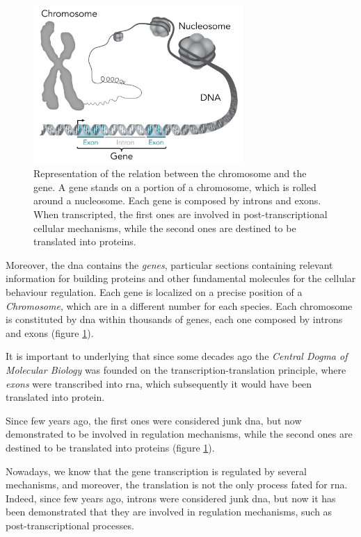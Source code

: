 \begin{figure}[h]
\centering
\includegraphics[width=8cm, keepaspectratio]{img/intro/gene_chrom.png}
\caption[Gene Chromosome relation]{Representation of the relation between the chromosome and the gene. 
A gene stands on a portion of a chromosome, which is rolled around a nucleosome.
Each gene is composed by introns and exons. When transcripted, the first ones are involved in post-transcriptional cellular mechanisms, while the second ones are destined to be translated into proteins.}
\label{fig:dnachromgene}
\end{figure}

Moreover, the \gls{dna} contains the \textit{genes}, particular sections containing relevant information for building proteins and other fundamental molecules for the cellular behaviour regulation.
Each gene is localized on a precise position of a \textit{Chromosome}, which are in a different number for each species.
Each chromosome is constituted by \gls{dna} within thousands of genes, each one composed by introns and exons (figure \ref{fig:dnachromgene}).

It is important to underlying that since some decades ago the \textit{Central Dogma of Molecular Biology} was founded on the transcription-translation principle, where \textit{exons} were transcribed into \gls{rna}, which subsequently it would have been translated into protein.

Since few years ago, the first ones were considered junk \gls{dna}, but now demonstrated to be involved in regulation mechanisms, while the second ones are destined to be translated into proteins (figure \ref{fig:dnachromgene}).

Nowadays, we know that the gene transcription is regulated by several mechanisms, and moreover, the translation is not the only process fated for \gls{rna}.
Indeed, since few years ago, introns were considered junk \gls{dna}, but now it has been demonstrated that they are involved in regulation mechanisms, such as post-transcriptional processes.

